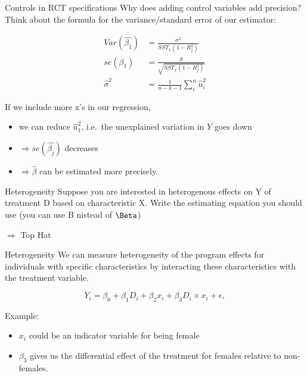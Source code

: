 \documentclass[
  ignorenonframetext,
]{beamer}
\begin{document}
\begin{frame}{Controls in RCT specifications}
\protect\hypertarget{controls-in-rct-specifications-4}{}
Why does adding control variables add precision? Think about the formula
for the variance/standard error of our estimator:

\[
 \begin{aligned}
 Var(\hat{\beta_1})&=\frac{\sigma^2}{SST_x(1-R^2_j)}\\
 se(\beta_1)&=\frac{\hat{\sigma}}{\sqrt{SST_x(1-R^2_j)}}\\
 \hat{\sigma}^2&=\frac{1}{n-k-1}\sum^n_i\hat{u}^2_i
 \end{aligned}
 \]

If we include more x's in our regression,

\begin{itemize}
\item
  we can reduce \(\hat{u}^2_1\), i.e.~the unexplained variation in \(Y\)
  goes down
\item
  \(\Rightarrow se(\hat{\beta_j})\) decreases
\item
  \(\Rightarrow \hat{\beta}\) can be estimated more precisely.
\end{itemize}
\end{frame}

\begin{frame}{Heterogeneity}
\protect\hypertarget{heterogeneity}{}
Suppose you are interested in heterogenous effects on Y of treatment D
based on characteristic X. Write the estimating equation you should use
(you can use B nistead of \(\Beta\))

\(\Rightarrow\) Top Hat
\end{frame}

\begin{frame}{Heterogeneity}
\protect\hypertarget{heterogeneity-1}{}
We can measure heterogeneity of the program effects for individuals with
specific characteristics by interacting these characteristics with the
treatment variable.

\[
Y_i=\beta_0+\beta_1 D_i+ \beta_2 x_i +\beta_3 D_i\times x_i+\epsilon,
\]

Example:

\begin{itemize}
\item
  \(x_i\) could be an indicator variable for being female
\item
  \(\beta_3\) gives us the differential effect of the treatment for
  females relative to non-females.
\end{itemize}
\end{frame}
\end{document}
